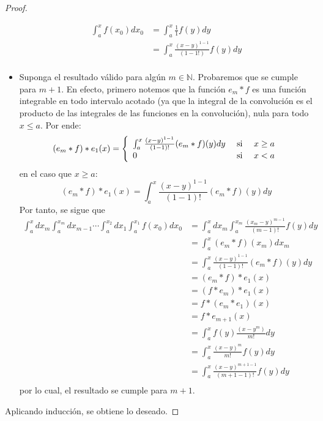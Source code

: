 \documentclass[12pt]{report}
\theoremstyle{largebreak}
\begin{document}
\begin{proof}
\begin{itemize}
            \begin{equation*}
                \begin{split}
                    \int_{a}^{ x}f(x_0)dx_0&=\int_{a}^{ x}\frac{1}{1}f(y)dy\\
                    &=\int_{a}^{ x}\frac{(x-y)^{1-1}}{(1-1!)}f(y)dy\\
                \end{split}
            \end{equation*}
            \item Suponga el resultado válido para algún $m\in\mathbb{N}$. Probaremos que se cumple para $m+1$. En efecto, primero notemos que la función $e_m*f$ es una función integrable en todo intervalo acotado (ya que la integral de la convolución es el producto de las integrales de las funciones en la convolución), nula para todo $x\leq a$. Por ende:
            \begin{equation*}
                (e_m*f)*e_1(x)=\left\{
                    \begin{array}{lcr}
                        \int_{a}^x\frac{(x-y)^{1-1}}{(1-1)!}(e_m*f)(y)dy & \textup{ si } & x\geq a \\
                        0 & \textup{ si }&x<a\\
                    \end{array}
                \right.
            \end{equation*}
            en el caso que $x\geq a$:
            \begin{equation*}
                (e_m*f)*e_1(x)=\int_{a}^x\frac{(x-y)^{1-1}}{(1-1)!}(e_m*f)(y)dy
            \end{equation*}
            Por tanto, se sigue que
            \begin{equation*}
                \begin{split}
                    \int_{a}^xdx_{ m}\int_a^{ x_{m}}dx_{m-1}\cdots\int_{a}^{x_{2}} dx_{1}\int_a^{ x_1}f(x_0)dx_0&=\int_{a}^xdx_{ m}\int_a^{x_m}\frac{(x_m-y)^{m-1}}{(m-1)!}f(y)dy\\
                    &=\int_{a}^x(e_m*f)(x_m)dx_m\\
                    &=\int_{a}^x\frac{(x-y)^{1-1}}{(1-1)!}(e_m*f)(y)dy\\
                    &=(e_m*f)*e_1(x)\\
                    &=(f*e_m)*e_1(x)\\
                    &=f*(e_m*e_1)(x)\\
                    &=f*e_{ m+1}(x)\\
                    &=\int_a^xf(y)\frac{(x-y^m)}{m!}dy\\
                    &=\int_a^x\frac{(x-y)^m}{m!}f(y)dy\\
                    &=\int_a^x\frac{(x-y)^{m+1-1}}{(m+1-1)!}f(y)dy\\
                \end{split}
            \end{equation*}
            por lo cual, el resultado se cumple para $m+1$.
        \end{itemize}
        Aplicando inducción, se obtiene lo deseado.
    \end{proof}
\end{document}
